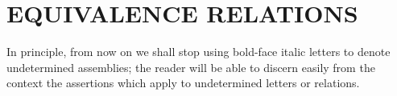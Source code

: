 \section{EQUIVALENCE RELATIONS}

In principle, from now on we shall stop using bold-face italic letters to denote undetermined assemblies; the reader will be able to discern easily from the context the assertions which apply to undetermined letters or relations.

